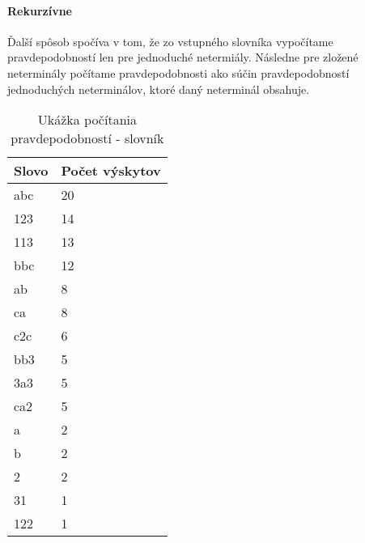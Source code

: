 \paragraph{Rekurzívne}
Ďalší spôsob spočíva v tom, že zo vstupného slovníka vypočítame pravdepodobností len pre jednoduché netermiály. Následne pre zložené neterminály počítame pravdepodobnosti ako súčin pravdepodobností jednoduchých neterminálov, ktoré daný neterminál obsahuje.

\begin{table}[]
\centering
\caption{Ukážka počítania pravdepodobností - slovník}
\label{slovnikPP}
\begin{tabular}{ll}
Slovo & Počet výskytov \\ \hline
abc & 20 \\ 
123 & 14 \\ 
113 & 13 \\ 
bbc & 12 \\ 
ab & 8 \\ 
ca & 8 \\ 
c2c & 6 \\ 
bb3 & 5 \\ 
3a3 & 5 \\ 
ca2 & 5 \\ 
a & 2 \\ 
b & 2 \\ 
2 & 2 \\ 
31 & 1 \\ 
122 & 1
\end{tabular}
\end{table}

